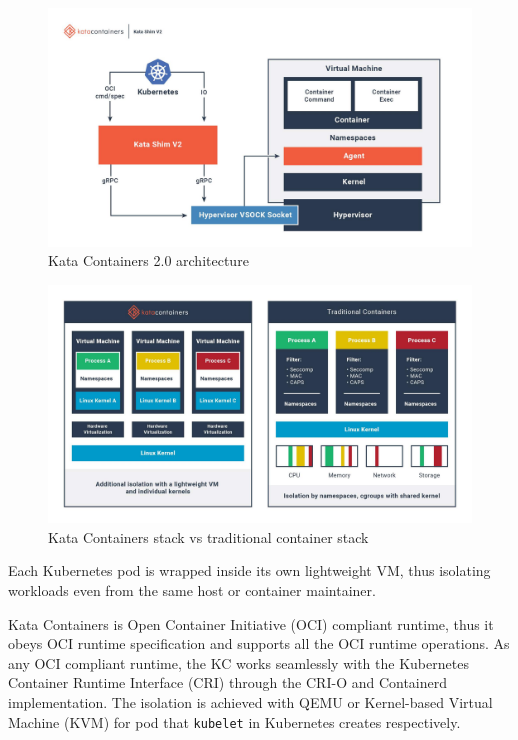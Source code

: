\begin{figure}[ht]
  \begin{center}
    \includegraphics[width=15cm]{LaTeX/images/KataContainersArchitecture.jpg}
    \caption{Kata Containers 2.0 architecture \cite{KataContainers}}
    \label{fig:KataContainersArchitecture}
  \end{center}
\end{figure}


\begin{figure}[ht]
  \begin{center}
    \includegraphics[width=14cm]{LaTeX/images/KataContainersStack.jpg}
    \caption{Kata Containers stack vs traditional container stack\cite{KataContainers}}
    \label{fig:KataContainersStack}
  \end{center}
\end{figure} 

Each Kubernetes pod is wrapped inside its own lightweight VM, thus isolating workloads even from the same host or container maintainer.




Kata Containers is Open Container Initiative (OCI) compliant runtime, thus it obeys OCI runtime specification and supports all the OCI runtime operations. As any OCI compliant runtime, the KC works seamlessly with the Kubernetes Container Runtime Interface (CRI) through the CRI-O and Containerd implementation. The isolation is achieved with QEMU \cite{QEMU} or Kernel-based Virtual Machine (KVM) \cite{KVM} for pod that \texttt{kubelet} in Kubernetes creates respectively.

